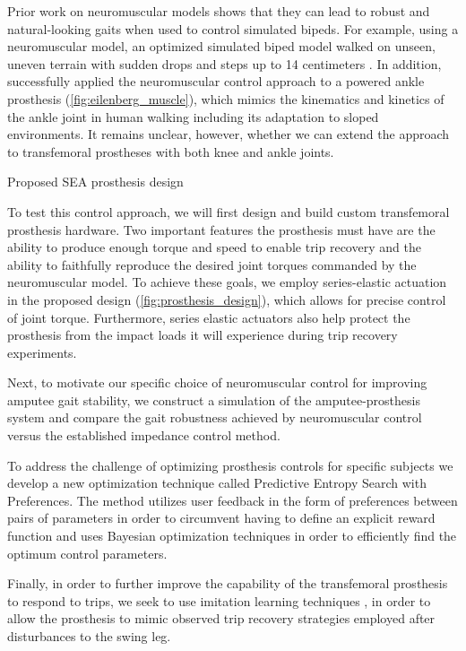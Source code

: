 Prior work on neuromuscular models shows that they can lead to robust and
natural-looking gaits when used to control simulated bipeds. For example, using
a neuromuscular model, an optimized simulated biped model walked on unseen,
uneven terrain with sudden drops and steps up to 14 centimeters
\citep{song2015neural}. In addition, \citet{eilenberg2010control} successfully
applied the neuromuscular control approach to a powered ankle prosthesis
(\cref{fig:eilenberg_muscle}), which mimics the kinematics and kinetics of the
ankle joint in human walking including its adaptation to sloped environments. It
remains unclear, however, whether we can extend the approach to transfemoral
prostheses with both knee and ankle joints.

\begin{marginfigure}
    \centering
    \caption{Proposed SEA prosthesis design}
    \label{fig:prosthesis_design}
\end{marginfigure}

To test this control approach, we will first design and build custom
transfemoral prosthesis hardware. Two important features the prosthesis must have
are the ability to produce enough torque and speed to enable trip recovery and
the ability to faithfully reproduce the desired joint torques commanded by the
neuromuscular model. To achieve these goals, we employ series-elastic
actuation~\cite{} in the proposed design (\cref{fig:prosthesis_design}), which
allows for precise control of joint torque. Furthermore, series elastic
actuators also help protect the prosthesis from the impact loads it will
experience during trip recovery experiments. 

Next, to motivate our specific choice of neuromuscular control for improving
amputee gait stability, we construct a simulation of the amputee-prosthesis
system and compare the gait robustness achieved by neuromuscular control versus
the established impedance control method.

To address the challenge of optimizing prosthesis controls for specific subjects
we develop a new optimization technique called Predictive Entropy Search with
Preferences. The method utilizes user feedback in the form of preferences
between pairs of parameters in order to circumvent having to define an explicit
reward function and uses Bayesian optimization techniques in order to
efficiently find the optimum control parameters. 

Finally, in order to further improve the capability of the transfemoral
prosthesis to respond to trips, we seek to use imitation learning techniques
\citep{argall2009survey}, in order to allow the prosthesis to mimic observed
trip recovery strategies employed after disturbances to the swing leg.

